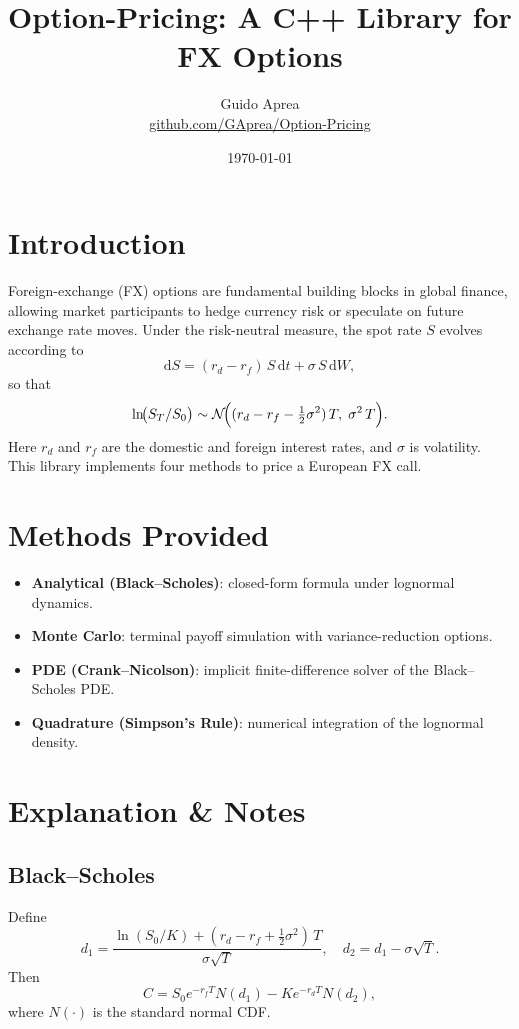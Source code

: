 \documentclass[a4paper,11pt]{article}
\title{Option-Pricing: A C++ Library for FX Options}
\author{Guido Aprea \\ \href{https://github.com/GAprea/Option-Pricing}{github.com/GAprea/Option-Pricing}}
\date{\today}
\begin{document}
\maketitle

\section{Introduction}
Foreign-exchange (FX) options are fundamental building blocks in global finance, allowing market participants to hedge currency risk or speculate on future exchange rate moves. Under the risk-neutral measure, the spot rate $S$ evolves according to
\[
  \mathrm{d}S = (r_d - r_f)\,S\,\mathrm{d}t + \sigma\,S\,\mathrm{d}W,
\]
so that
\[
  \ln\!\bigl(S_T / S_0\bigr)
  \sim
  \mathcal{N}\!\Bigl((r_d - r_f - \tfrac12\sigma^2)\,T,\;\sigma^2\,T\Bigr).
\]
Here $r_d$ and $r_f$ are the domestic and foreign interest rates, and $\sigma$ is volatility. This library implements four methods to price a European FX call.

\section*{Methods Provided}
\begin{itemize}
  \item \textbf{Analytical (Black–Scholes)}: closed-form formula under lognormal dynamics.
  \item \textbf{Monte Carlo}: terminal payoff simulation with variance-reduction options.
  \item \textbf{PDE (Crank–Nicolson)}: implicit finite-difference solver of the Black–Scholes PDE.
  \item \textbf{Quadrature (Simpson’s Rule)}: numerical integration of the lognormal density.
\end{itemize}

\section{Explanation \& Notes}

\subsection*{Black–Scholes}
Define
\[
  d_1 = \frac{\ln(S_0/K) + (r_d - r_f + \tfrac12\sigma^2)\,T}{\sigma\sqrt{T}},
  \quad
  d_2 = d_1 - \sigma\sqrt{T}.
\]
Then
\[
  C = S_0 e^{-r_f T} N(d_1) - K e^{-r_d T} N(d_2),
\]
where $N(\cdot)$ is the standard normal CDF.
\end{document}
